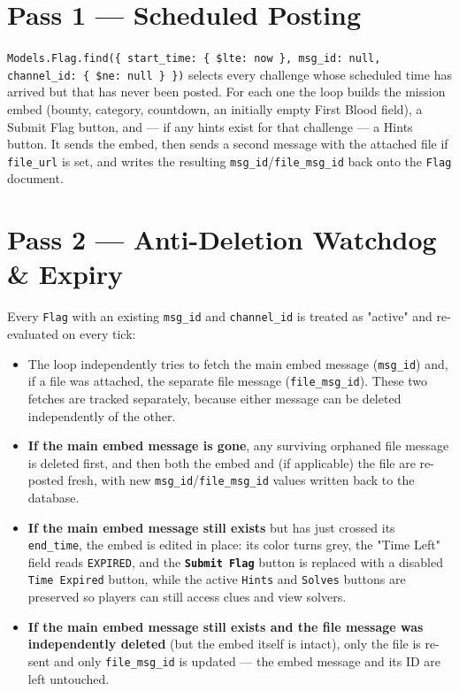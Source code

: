\documentclass[12pt,a4paper]{report}
\newcommand{\cmd}[1]{\texttt{\color{cybercyan}\textbf{#1}}}
\begin{document}
\section{Pass 1 --- Scheduled Posting}

\texttt{Models.Flag.find(\{ start\_time: \{ \$lte: now \}, msg\_id: null, channel\_id: \{ \$ne: null \} \})}
selects every challenge whose scheduled time has arrived but that has never been posted. For each
one the loop builds the mission embed (bounty, category, countdown, an initially empty First Blood
field), a Submit Flag button, and --- if any hints exist for that challenge --- a Hints button. It
sends the embed, then sends a second message with the attached file if \texttt{file\_url} is set,
and writes the resulting \texttt{msg\_id}/\texttt{file\_msg\_id} back onto the \texttt{Flag}
document.

\section{Pass 2 --- Anti-Deletion Watchdog \& Expiry}

Every \texttt{Flag} with an existing \texttt{msg\_id} and \texttt{channel\_id} is treated as
"active" and re-evaluated on every tick:

\begin{itemize}
    \item The loop independently tries to fetch the main embed message (\texttt{msg\_id}) and, if
          a file was attached, the separate file message (\texttt{file\_msg\_id}). These two
          fetches are tracked separately, because either message can be deleted independently of
          the other.
    \item \textbf{If the main embed message is gone}, any surviving orphaned file message is
          deleted first, and then both the embed and (if applicable) the file are re-posted fresh,
          with new \texttt{msg\_id}/\texttt{file\_msg\_id} values written back to the database.
    \item \textbf{If the main embed message still exists} but has just crossed its
          \texttt{end\_time}, the embed is edited in place: its color turns grey, the "Time Left"
          field reads \texttt{EXPIRED}, and the \cmd{Submit Flag} button is replaced with a
          disabled \texttt{Time Expired} button, while the active \texttt{Hints} and \texttt{Solves}
          buttons are preserved so players can still access clues and view solvers.
    \item \textbf{If the main embed message still exists and the file message was independently
          deleted} (but the embed itself is intact), only the file is re-sent and only
          \texttt{file\_msg\_id} is updated --- the embed message and its ID are left untouched.
\end{itemize}
\end{document}
